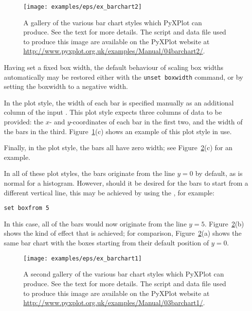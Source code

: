 \begin{figure}
\begin{center}
\texttt{[image: examples/eps/ex\_barchart2]}
\end{center}
\caption[A gallery of the various bar chart styles which PyXPlot can produce]
{A gallery of the various bar chart styles which PyXPlot can produce.
See the text for more details.  The script and data file used to produce this
image are available on the PyXPlot website at
\protect\url{http://www.pyxplot.org.uk/examples/Manual/04barchart2/}.}
\label{fig:ex_barchart2}
\end{figure}

Having set a fixed box width, the default behaviour of scaling box widths
automatically may be restored either with the {\tt unset boxwidth} command,
or by setting the boxwidth to a negative width.

In the  plot style, the width of each bar is specified manually
as an additional column of the input \datafile.  This plot style expects three
columns of data to be provided: the $x$- and $y$-coordinates of each bar in the
first two, and the width of the bars in the third.
Figure~\ref{fig:ex_barchart2}(c) shows an example of this plot style in use.

Finally, in the  plot style, the bars all have zero width; see
Figure~\ref{fig:ex_barchart1}(c) for an example.

In all of these plot styles, the bars originate from the line $y=0$ by default,
as is normal for a histogram. However, should it be desired for the bars to
start from a different vertical line, this may be achieved by using the
, for example:

\begin{verbatim}
set boxfrom 5
\end{verbatim}

\noindent In this case, all of the bars would now originate from the line
$y=5$. Figure~\ref{fig:ex_barchart1}(b) shows the kind of effect that is
achieved; for comparison, Figure~\ref{fig:ex_barchart1}(a) shows the same bar
chart with the boxes starting from their default position of $y=0$.

\begin{figure}
\begin{center}
\texttt{[image: examples/eps/ex\_barchart1]}
\end{center}
\caption[A second gallery of the various bar chart styles which PyXPlot can
produce]
{A second gallery of the various bar chart styles which PyXPlot can
produce. See the text for more details.  The script and data file used to
produce this image are available on the PyXPlot website at
\protect\url{http://www.pyxplot.org.uk/examples/Manual/03barchart1/}.}
\label{fig:ex_barchart1}
\end{figure}

